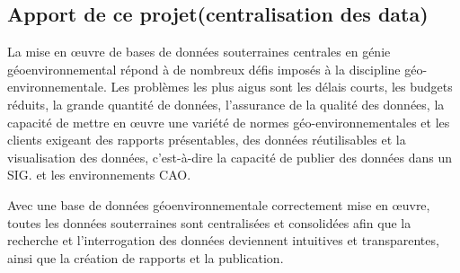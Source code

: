     \subsection{Apport de ce projet(centralisation des data)}
    La mise en œuvre de bases de données souterraines centrales en 
    génie géoenvironnemental répond à de nombreux défis imposés à la 
    discipline géo-environnementale. Les problèmes les plus aigus sont 
    les délais courts, les budgets réduits, la grande quantité de 
    données, l'assurance de la qualité des données, la capacité de 
    mettre en œuvre une variété de normes géo-environnementales et les 
    clients exigeant des rapports présentables, des données réutilisables 
    et la visualisation des données, c'est-à-dire la capacité de publier 
    des données dans un SIG. et les environnements CAO. \par 
    Avec une base de données géoenvironnementale correctement mise en œuvre, 
    toutes les données souterraines sont centralisées et consolidées afin que 
    la recherche et l'interrogation des données deviennent intuitives et 
    transparentes, ainsi que la création de rapports et la publication.
